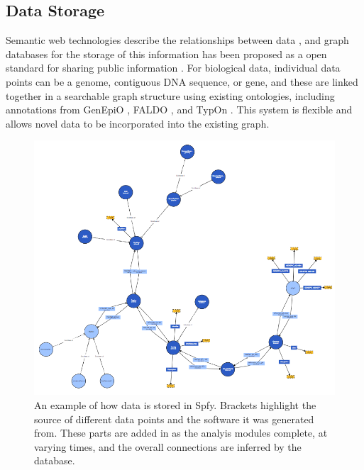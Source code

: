 \documentclass{article}
\begin{document}
\subsection{Data Storage}
Semantic web technologies describe the relationships between data \cite{berners2001semantic}, and graph databases for the storage of this information has been proposed as a open standard for sharing public information \cite{horrocks2005semantic}. For biological data, individual data points can be a genome, contiguous DNA sequence, or gene, and these are linked together in a searchable graph structure using existing ontologies, including annotations from GenEpiO \cite{griffiths2017context}, FALDO \cite{bolleman2016faldo}, and TypOn \cite{vaz2014typon}. This system is flexible and allows novel data to be incorporated into the existing graph.
\begin{figure}[!hb]
\begin{center}
\includegraphics[width=\textwidth]{images/ontology}
\end{center}
\caption{An example of how data is stored in Spfy. Brackets highlight the source of different data points and the software it was generated from. These parts are added in as the analyis modules complete, at varying times, and the overall connections are inferred by the database.}
\label{fig-ontology}
\end{figure}
\end{document}
